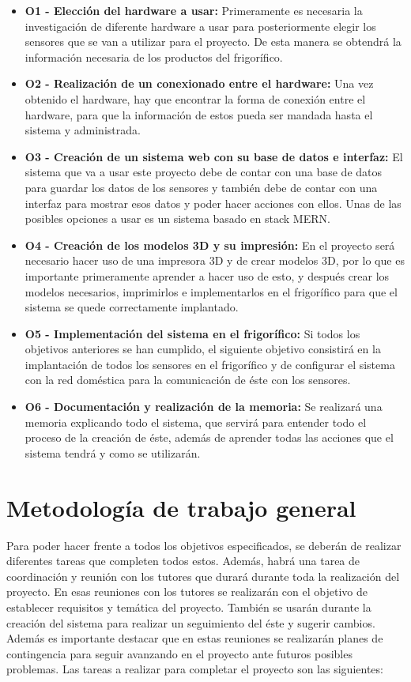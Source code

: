 \begin{itemize}
    \item \textbf{O1 - Elección del hardware a usar:} Primeramente es necesaria la investigación de diferente hardware a usar para posteriormente elegir los sensores que se van a utilizar para el proyecto. De esta manera se obtendrá la información necesaria de los productos del frigorífico.
    \item \textbf{O2 - Realización de un conexionado entre el hardware:} Una vez obtenido el hardware, hay que encontrar la forma de conexión entre el hardware, para que la información de estos pueda ser mandada hasta el sistema y administrada.
    \item \textbf{O3 - Creación de un sistema web con su base de datos e interfaz:} El sistema que va a usar este proyecto debe de contar con una base de datos para guardar los datos de los sensores y también debe de contar con una interfaz para mostrar esos datos y poder hacer acciones con ellos. Unas de las posibles opciones a usar es un sistema basado en stack MERN.
    \item \textbf{O4 - Creación de los modelos 3D y su impresión:} En el proyecto será necesario hacer uso de una impresora 3D y de crear modelos 3D, por lo que es importante primeramente aprender a hacer uso de esto, y después crear los modelos necesarios, imprimirlos e implementarlos en el frigorífico para que el sistema se quede correctamente implantado.
    \item \textbf{O5 - Implementación del sistema en el frigorífico:} Si todos los objetivos anteriores se han cumplido, el siguiente objetivo consistirá en la implantación de todos los sensores en el frigorífico y de configurar el sistema con la red doméstica para la comunicación de éste con los sensores.
    \item \textbf{O6 - Documentación y realización de la memoria:} Se realizará una memoria explicando todo el sistema, que servirá para entender todo el proceso de la creación de éste, además de aprender todas las acciones que el sistema tendrá y como se utilizarán.
\end{itemize}

\section{Metodología de trabajo general}

Para poder hacer frente a todos los objetivos especificados, se deberán de realizar diferentes tareas que completen todos estos. Además, habrá  una tarea de coordinación y reunión con los tutores que durará durante toda la realización del proyecto. En esas reuniones con los tutores se realizarán con el objetivo de establecer requisitos y temática del proyecto. También se usarán durante la creación del sistema para realizar un seguimiento del éste y sugerir cambios. Además es importante destacar que en estas reuniones se realizarán planes de contingencia para seguir avanzando en el proyecto ante futuros posibles problemas. Las tareas a realizar para completar el proyecto son las siguientes:

